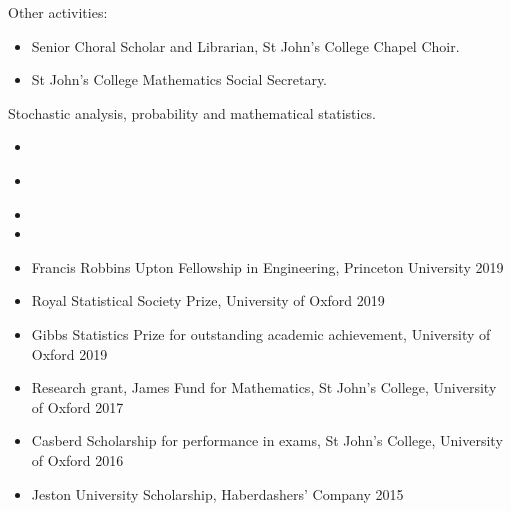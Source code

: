 \documentclass[
  date,
  number,
]{wgu-cv}
\begin{document}
Other activities:

\begin{itemize}
	\item Senior Choral Scholar and Librarian,
    St John's College Chapel Choir.
	\item St John's College Mathematics Social Secretary.
\end{itemize}



Stochastic analysis, probability and mathematical statistics.



\begin{itemize}
	\item {}
\end{itemize}

\begin{itemize}
\item {}
\end{itemize}

\begin{itemize}
  \item {}
  \item {}
\end{itemize}


\pagebreak



\begin{itemize}
  \item Francis Robbins Upton Fellowship in Engineering,
    Princeton University
    \hfill 2019%
  \item Royal Statistical Society Prize,
    University of Oxford
    \hfill 2019%
  \item Gibbs Statistics Prize for outstanding academic achievement,
    University of Oxford
    \hfill 2019%
	\item Research grant, James Fund for Mathematics,
    St John's College, University of Oxford
    \hfill 2017%
	\item Casberd Scholarship for performance in exams,
    St John's College, University of Oxford
    \hfill 2016%
  \item Jeston University Scholarship,
    Haberdashers' Company
    \hfill 2015%
\end{itemize}
\end{document}
